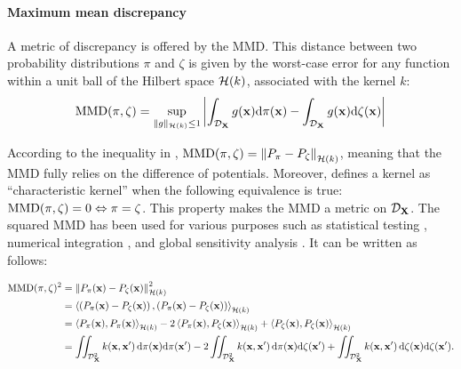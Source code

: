 \paragraph{Maximum mean discrepancy}
A metric of discrepancy is offered by the MMD. 
This distance between two probability distributions $\pi$ and $\zeta$ is given by the worst-case error for any function within a unit ball of the Hilbert space $\mathcal{H}(k)$, associated with the kernel $k$:
\begin{equation}
    \MMD(\pi, \zeta) = %
    \sup_{\lVert g \lVert_{\iH(k)} \leq 1}
            \left | \int_{\iD_{\bX}} g(\bx) \dd \pi(\bx) - \int_{\iD_{\bX}} g(\bx) \dd \zeta(\bx) \right| %
    \label{eq:mmd_c4}  
\end{equation}

According to the inequality in , $\mathrm{MMD}(\pi, \zeta) = \left\lVert P_{\pi} - P_{\zeta} \right\lVert_{\mathcal{H}(k)}$, meaning that the MMD fully relies on the difference of potentials. 
Moreover, \cite{sriperumbudur_2010} defines a kernel as ``characteristic kernel'' when the following equivalence is true: $\mathrm{MMD}(\pi, \zeta) = 0 \Leftrightarrow \pi = \zeta$. 
This property makes the MMD a metric on $\mathcal{D}_{{\bf X}}$. 
The squared MMD has been used for various purposes such as statistical testing \citep{gretton_2006}, numerical integration \citep{chen_welling_2010}, and global sensitivity analysis \citep{daveiga_2015}. 
It can be written as follows:

\begin{subequations}
\begin{align}
    \mathrm{MMD}(\pi, \zeta)^2 &= \left\lVert P_{\pi}({\bf x}) - P_{\zeta}({\bf x}) \right\lVert^2_{\mathcal{H}(k)}\\
        &= \left\langle \left(P_{\pi}({\bf x}) - P_{\zeta}({\bf x}) \right), \left(P_{\pi}({\bf x}) - P_{\zeta}({\bf x}) \right) \right\rangle_{\mathcal{H}(k)}\\
        &= \left\langle P_{\pi}({\bf x}), P_{\pi}({\bf x}) \right\rangle_{\mathcal{H}(k)} - 2 \left\langle P_{\pi}({\bf x}), P_{\zeta}({\bf x}) \right\rangle_{\mathcal{H}(k)} + \left\langle P_{\zeta}({\bf x}), P_{\zeta}({\bf x}) \right\rangle_{\mathcal{H}(k)}\\
        &= \iint_{\mathcal{D}_{{\bf X}}^2} k({\bf x}, {\bf x}')\, \mathrm{d}\pi({\bf x}) \mathrm{d}\pi({\bf x}') - 2 \iint_{\mathcal{D}_{{\bf X}}^2} k({\bf x}, {\bf x}')\, \mathrm{d}\pi({\bf x}) \mathrm{d}\zeta({\bf x}') + \iint_{\mathcal{D}_{{\bf X}}^2} k({\bf x}, {\bf x}')\, \mathrm{d}\zeta({\bf x}) \mathrm{d}\zeta({\bf x}').
\end{align}
\end{subequations}


